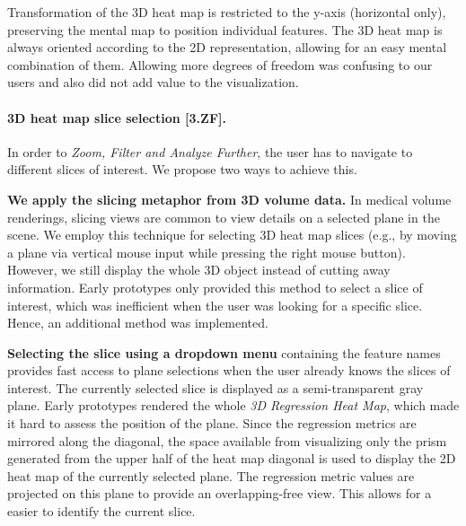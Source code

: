 \documentclass[journal]{style/vgtc} 			          %
\begin{document}
Transformation of the 3D heat map is restricted to the y-axis (horizontal only), preserving the mental map to position individual features.
The 3D heat map is always oriented according to the 2D representation, allowing for an easy mental combination of them.
Allowing more degrees of freedom was confusing to our users and also did not add value to the visualization.
\paragraph{3D heat map slice selection [\textbf{3.ZF}].}
In order to \emph{Zoom, Filter and Analyze Further}, the user has to navigate to different slices of interest.
We propose two ways to achieve this.

	\textbf{We apply the slicing metaphor from 3D volume data.}
	In medical volume renderings, slicing views are common to view details on a selected plane in the scene.
	We employ this technique for selecting 3D heat map slices (e.g., by moving a plane via vertical mouse input while pressing the right mouse button).
	However, we still display the whole 3D object instead of cutting away information. %
	Early prototypes only provided this method to select a slice of interest, which was inefficient when the user was looking for a specific slice.
	Hence, an additional method was implemented.

	\textbf{Selecting the slice using a dropdown menu} containing the feature names provides fast access to plane selections when the user already knows the slices of interest.
The currently selected slice is displayed as a semi-transparent gray plane.
Early prototypes rendered the whole \emph{3D Regression Heat Map}, which made it hard to assess the position of the plane.
Since the regression metrics are mirrored along the diagonal, the space available from visualizing only the prism generated from the upper half of the heat map diagonal is used to display the 2D heat map of the currently selected plane.
The regression metric values are projected on this plane to provide an overlapping-free view.
This allows for a easier to identify the current slice.
\end{document}
